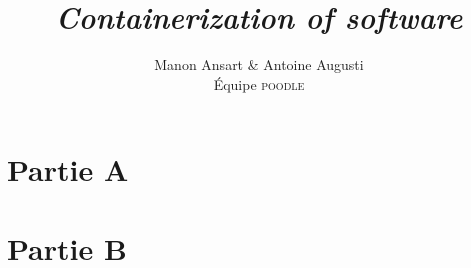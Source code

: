 \documentclass[a4paper, 12pt, french, titlepage]{scrartcl}
\title{\textit{Containerization of software}}
\author{Manon Ansart \& Antoine Augusti\\Équipe \textsc{poodle}}
\date{}
\begin{document}
    \maketitle

    \section*{Partie A}
        

    \section*{Partie B}
        

    
    
\end{document}
